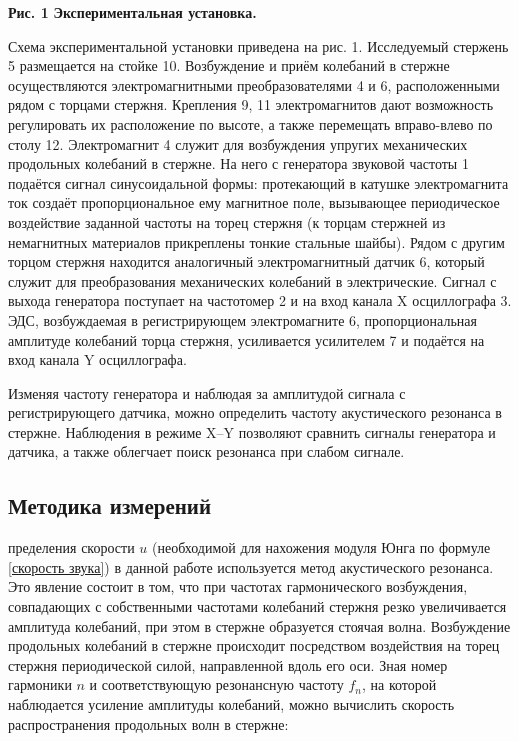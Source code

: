 \begin{flushright}
{\scriptsize \textbf{Рис. 1} \textbf {Экспериментальная установка.}}
\end{flushright}



    Схема экспериментальной установки приведена на рис. 1. Исследуемый стержень 5 размещается на стойке 10. Возбуждение и приём колебаний в стержне осуществляются электромагнитными преобразователями 4 и 6, расположенными рядом с торцами стержня. Крепления 9, 11 электромагнитов дают возможность регулировать их расположение по высоте, а также перемещать вправо-влево по столу 12. Электромагнит 4 служит для возбуждения упругих механических продольных колебаний в стержне. На него с генератора звуковой частоты 1 подаётся сигнал синусоидальной формы: протекающий в катушке электромагнита ток создаёт пропорциональное ему магнитное поле, вызывающее периодическое воздействие заданной частоты на торец стержня (к торцам стержней из немагнитных материалов прикреплены тонкие стальные шайбы). Рядом с другим торцом стержня находится аналогичный электромагнитный датчик 6, который служит для преобразования механических колебаний в электрические. Сигнал с выхода генератора поступает на частотомер 2 и на вход канала X осциллографа 3. ЭДС, возбуждаемая в регистрирующем электромагните 6, пропорциональная амплитуде колебаний торца стержня, усиливается усилителем 7 и подаётся на вход канала Y осциллографа. 
    
    Изменяя частоту генератора и наблюдая за амплитудой сигнала с регистрирующего датчика, можно определить частоту акустического резонанса в стержне. Наблюдения в режиме X–Y позволяют сравнить сигналы генератора и датчика, а также облегчает поиск резонанса при слабом сигнале.
    
    
\subsection{Методика измерений}

    пределения скорости $u$ (необходимой для нахожения модуля Юнга по формуле \eqref{скорость звука}) в данной работе используется метод акустического резонанса. Это явление состоит в том, что при частотах гармонического возбуждения, совпадающих с собственными частотами колебаний стержня резко увеличивается амплитуда колебаний, при этом в стержне образуется стоячая волна. Возбуждение продольных колебаний в стержне происходит посредством воздействия на торец стержня периодической силой, направленной вдоль его оси. Зная номер гармоники $n$ и соответствующую резонансную частоту $f_n$, на которой наблюдается усиление амплитуды колебаний, можно вычислить скорость распространения продольных волн в стержне:
    
